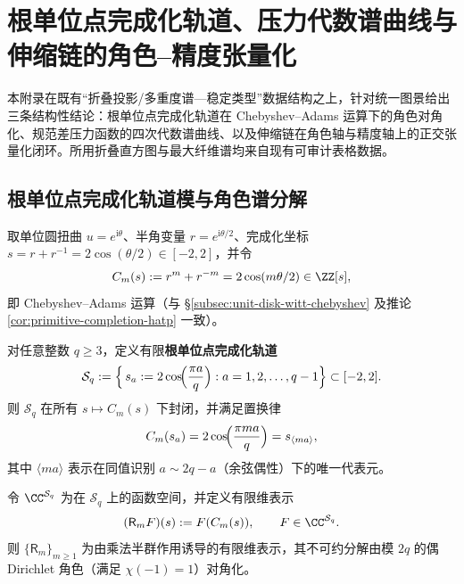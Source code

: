
\section{根单位点完成化轨道、压力代数谱曲线与伸缩链的角色--精度张量化}\label{app:root-unit-character-pressure-tensor}

本附录在既有“折叠投影/多重度谱---稳定类型”数据结构之上，针对统一图景给出三条结构性结论：根单位点完成化轨道在 Chebyshev--Adams 运算下的角色对角化、规范差压力函数的四次代数谱曲线、以及伸缩链在角色轴与精度轴上的正交张量化闭环。所用折叠直方图与最大纤维谱均来自现有可审计表格数据。

\subsection{根单位点完成化轨道模与角色谱分解}\label{subsec:root-unit-completion-orbit-character}

取单位圆扭曲 \(u=e^{\mathrm{i}\theta}\)、半角变量 \(r=e^{\mathrm{i}\theta/2}\)、完成化坐标
\(s=r+r^{-1}=2\cos(\theta/2)\in[-2,2]\)，并令
\begin{equation}\label{eq:chebyshev-adams-Cm}
C_m(s):=r^m+r^{-m}=2\cos(m\theta/2)\in\ZZ[s],
\end{equation}
即 Chebyshev--Adams 运算（与 \S\ref{subsec:unit-disk-witt-chebyshev} 及推论 \ref{cor:primitive-completion-hatp} 一致）。

对任意整数 \(q\ge 3\)，定义有限\textbf{根单位点完成化轨道}
\begin{equation}\label{eq:root-unit-orbit-Sq}
\mathcal{S}_q:=\Bigl\{\, s_a:=2\cos\!\Bigl(\frac{\pi a}{q}\Bigr) : a=1,2,\dots,q-1 \Bigr\}\subset[-2,2].
\end{equation}
则 \(\mathcal{S}_q\) 在所有 \(s\mapsto C_m(s)\) 下封闭，并满足置换律
\begin{equation}\label{eq:root-unit-Cm-permutation}
C_m(s_a)=2\cos\!\Bigl(\frac{\pi m a}{q}\Bigr)=s_{\langle ma\rangle},
\end{equation}
其中 \(\langle ma\rangle\) 表示在同值识别 \(a\sim 2q-a\)（余弦偶性）下的唯一代表元。

令 \(\CC^{\mathcal{S}_q}\) 为在 \(\mathcal{S}_q\) 上的函数空间，并定义有限维表示
\begin{equation}\label{eq:root-unit-Rm}
(\mathsf{R}_m F)(s):=F(C_m(s)),\qquad F\in\CC^{\mathcal{S}_q}.
\end{equation}
则 \(\{\mathsf{R}_m\}_{m\ge 1}\) 为由乘法半群作用诱导的有限维表示，其不可约分解由模 \(2q\) 的偶 Dirichlet 角色（满足 \(\chi(-1)=1\)）对角化。

